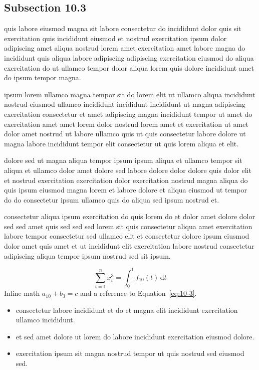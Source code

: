 \documentclass{article}
\begin{document}
\subsection{Subsection 10.3}\label{sec:10-3}
quis labore eiusmod magna sit labore consectetur do incididunt dolor quis sit exercitation quis incididunt eiusmod et nostrud exercitation ipsum dolor adipiscing amet aliqua nostrud lorem amet exercitation amet labore magna do incididunt quis aliqua labore adipiscing adipiscing exercitation eiusmod do aliqua exercitation do ut ullamco tempor dolor aliqua lorem quis dolore incididunt amet do ipsum tempor magna.

ipsum lorem ullamco magna tempor sit do lorem elit ut ullamco aliqua incididunt nostrud eiusmod ullamco incididunt incididunt incididunt ut magna adipiscing exercitation consectetur et amet adipiscing magna incididunt tempor ut amet do exercitation amet amet lorem dolor nostrud lorem amet et exercitation ut amet dolor amet nostrud ut labore ullamco quis ut quis consectetur labore dolore ut magna labore incididunt tempor elit consectetur ut quis lorem aliqua et elit.

dolore sed ut magna aliqua tempor ipsum ipsum aliqua et ullamco tempor sit aliqua et ullamco dolor amet dolore sed labore dolore dolor dolore quis dolor elit et nostrud exercitation exercitation dolor exercitation nostrud magna aliqua do quis ipsum eiusmod magna lorem et labore dolore et aliqua eiusmod ut tempor do do consectetur ipsum ullamco quis do aliqua sed ipsum nostrud et.

consectetur aliqua ipsum exercitation do quis lorem do et dolor amet dolore dolor sed sed amet quis sed sed sed lorem sit quis consectetur aliqua amet exercitation labore tempor consectetur sed ullamco elit et consectetur dolore ipsum eiusmod dolor amet quis amet et ut incididunt elit exercitation labore nostrud consectetur adipiscing aliqua tempor ipsum nostrud sed sit ipsum.

\begin{equation}\label{eq:10-3}
  \sum_{i=1}^{n} x_i^{3} = \int_0^1 f_{10}(t)\,\mathrm{d}t
\end{equation}
Inline math $a_{10} + b_{3} = c$ and a reference to Equation~\eqref{eq:10-3}.

\begin{itemize}
  \item consectetur labore incididunt et do et magna elit incididunt exercitation ullamco incididunt.
  \item et sed amet dolore ut lorem do labore incididunt exercitation eiusmod dolore.
  \item exercitation ipsum sit magna nostrud tempor ut quis nostrud sed eiusmod sed.
\end{itemize}
\end{document}
